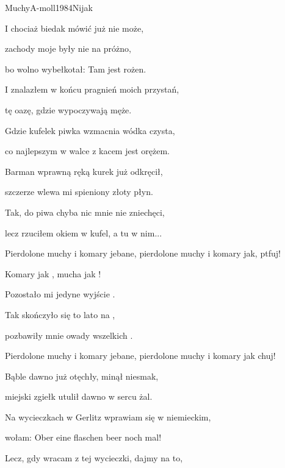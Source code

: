 \begin{song}{Muchy}{A-moll}{1984}{Nijak}{}{}
\begin{SBVerse}
    I chociaż biedak mówić już nie może,

    zachody moje były nie na próżno,

    bo wolno wybełkotał: Tam jest rożen.
  \end{SBVerse}
  \begin{SBVerse}
    I znalazłem w końcu pragnień moich przystań,

    tę oazę, gdzie wypoczywają męże.

    Gdzie kufelek piwka wzmacnia wódka czysta,

    co najlepszym w walce z kacem jest orężem.
  \end{SBVerse}
  \begin{SBVerse}
    Barman wprawną ręką kurek już odkręcił,

    szczerze wlewa mi spieniony złoty płyn.

    Tak, do piwa chyba nic mnie nie zniechęci,

    lecz rzuciłem okiem w kufel, a tu w nim...
  \end{SBVerse}

  \begin{SBChorus}
    Pierdolone muchy i komary jebane, pierdolone muchy i komary jak, ptfuj!
  \end{SBChorus}

  \begin{SBVerse}
    Komary jak , mucha jak !

    Pozostało mi jedyne wyjście .

    Tak skończyło się to lato na ,

    pozbawiły mnie owady wszelkich .
  \end{SBVerse}

  \begin{SBChorus}
    Pierdolone muchy i komary jebane, pierdolone muchy i komary jak chuj!
  \end{SBChorus}

  \begin{SBVerse}
    Bąble dawno już otęchły, minął niesmak,

    miejski zgiełk utulił dawno w sercu żal.

    Na wycieczkach w Gerlitz wprawiam się w niemieckim,

    wołam: Ober eine flaschen beer noch mal!
  \end{SBVerse}
  \begin{SBVerse}
    Lecz, gdy wracam z tej wycieczki, dajmy na to,


\end{SBVerse}
\end{song}
